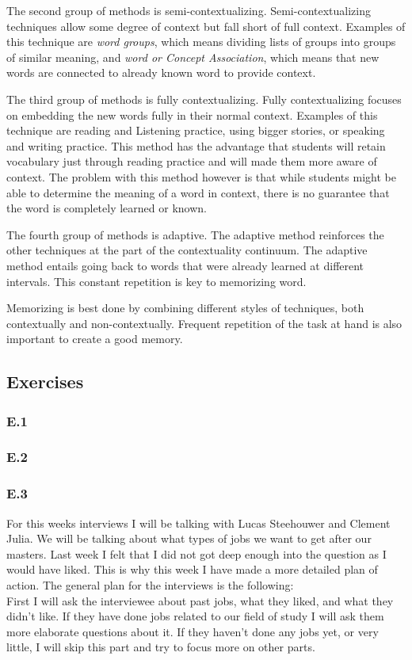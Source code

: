 \documentclass[]{article}
\begin{document}
The second group of methods is semi-contextualizing. Semi-contextualizing techniques allow
some degree of context but fall short of full context. Examples of this technique
are \textit{word groups}, which means dividing lists of groups into groups of similar meaning,
and \textit{word or Concept Association}, which means that new words are 
connected to already known word to provide context.

The third group of methods is fully contextualizing. Fully contextualizing focuses on 
embedding the new words fully in their normal context. Examples of this technique
are reading and Listening practice, using bigger stories, or speaking and writing practice. 
This method has the advantage that students will retain vocabulary just through 
reading practice and will made them more aware of context. The problem with this 
method however is that while students might be able to determine the meaning of 
a word in context, there is no guarantee that the word is completely learned or known.

The fourth group of methods is adaptive. The adaptive method reinforces the other 
techniques at the part of the contextuality continuum. The adaptive method entails 
going back to words that were already learned at different intervals. This 
constant repetition is key to memorizing word. 

Memorizing is best done by combining different styles of techniques, both 
contextually and non-contextually. Frequent repetition of the task at hand is 
also important to create a good memory.

\subsection*{Exercises} 

\subsubsection*{E.1}


\subsubsection*{E.2}


\subsubsection*{E.3}
For this weeks interviews I will be talking with Lucas Steehouwer and Clement Julia.
We will be talking about what types of jobs we want to get after our masters.
Last week I felt that I did not got deep enough into the question as
I would have liked. This is why this week I have made a more detailed plan of action.
The general plan for the interviews is the following:\\
First I will ask the interviewee about past jobs, what they liked, 
and what they didn't like.
If they have done jobs related to our field of study I will ask them more elaborate 
questions about it. 
If they haven't done any jobs yet, or very little, I will skip this part and 
try to focus more on other parts.
\end{document}
